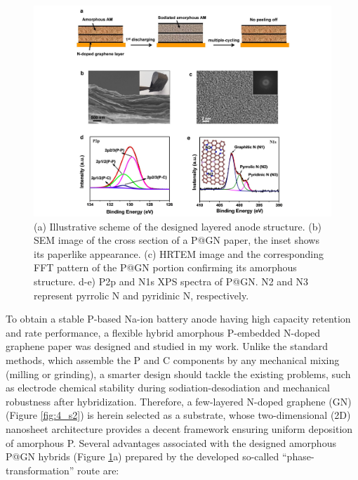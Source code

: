 \begin{figure}  
\includegraphics[height=\textwidth, angle=-90]{figures/figure4_1}
\caption[Layered structure design]
{(a) Illustrative scheme of the designed layered anode structure. (b) SEM image of the cross section of a P@GN paper, the inset shows its paperlike appearance. (c) HRTEM image and the corresponding FFT pattern of the P@GN portion confirming its amorphous structure. d-e) P2p and N1s XPS spectra of P@GN. N2 and N3 represent pyrrolic N and pyridinic N, respectively. 
\label{fig:4_1}}
\end{figure}

To obtain a stable P-based Na-ion battery anode having high capacity retention and rate performance, a flexible hybrid amorphous P-embedded N-doped graphene paper was designed and studied in my work. Unlike the standard methods, which assemble the P and C components by any mechanical mixing (milling or grinding), a smarter design should tackle the existing problems, such as electrode chemical stability during sodiation-desodiation and mechanical robustness after hybridization. Therefore, a few-layered N-doped graphene (GN) (Figure \ref{fig:4_s2}) is herein selected as a substrate, whose two-dimensional (2D) nanosheet architecture provides a decent framework ensuring uniform deposition of amorphous P.\cite{Nicolosi2013b,Huang2015b} Several advantages associated with the designed amorphous P@GN hybrids (Figure \ref{fig:4_1}a) prepared by the developed so-called “phase-transformation” route are:\\

